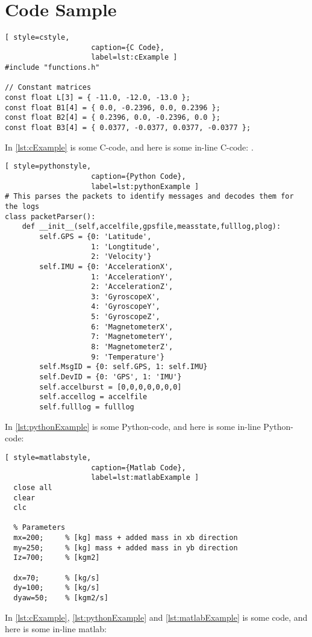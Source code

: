 \section{Code Sample}

\begin{lstlisting}[ style=cstyle,
                    caption={C Code}, 
                    label=lst:cExample ]
#include "functions.h"

// Constant matrices
const float L[3] = { -11.0, -12.0, -13.0 };
const float B1[4] = { 0.0, -0.2396, 0.0, 0.2396 };
const float B2[4] = { 0.2396, 0.0, -0.2396, 0.0 };
const float B3[4] = { 0.0377, -0.0377, 0.0377, -0.0377 };
\end{lstlisting}

In \autoref{lst:cExample} is some C-code, and here is some in-line C-code: .

\begin{lstlisting}[ style=pythonstyle,
                    caption={Python Code}, 
                    label=lst:pythonExample ]
# This parses the packets to identify messages and decodes them for the logs
class packetParser():
    def __init__(self,accelfile,gpsfile,measstate,fulllog,plog):
        self.GPS = {0: 'Latitude',
                    1: 'Longtitude',
                    2: 'Velocity'}
        self.IMU = {0: 'AccelerationX',
                    1: 'AccelerationY',
                    2: 'AccelerationZ',
                    3: 'GyroscopeX',
                    4: 'GyroscopeY',
                    5: 'GyroscopeZ',
                    6: 'MagnetometerX',
                    7: 'MagnetometerY',
                    8: 'MagnetometerZ',
                    9: 'Temperature'}
        self.MsgID = {0: self.GPS, 1: self.IMU}
        self.DevID = {0: 'GPS', 1: 'IMU'}
        self.accelburst = [0,0,0,0,0,0,0]
        self.accellog = accelfile
        self.fulllog = fulllog
\end{lstlisting}

In \autoref{lst:pythonExample} is some Python-code, and here is some in-line Python-code:\\ 

\begin{lstlisting}[ style=matlabstyle,
                    caption={Matlab Code}, 
                    label=lst:matlabExample ]
  close all
  clear
  clc
  
  % Parameters
  mx=200;     % [kg] mass + added mass in xb direction
  my=250;     % [kg] mass + added mass in yb direction
  Iz=700;     % [kgm2]
  
  dx=70;      % [kg/s] 
  dy=100;     % [kg/s]
  dyaw=50;    % [kgm2/s]
\end{lstlisting}

In \autoref{lst:cExample}, \ref{lst:pythonExample} and \ref{lst:matlabExample} is some code, and here is some in-line matlab: 